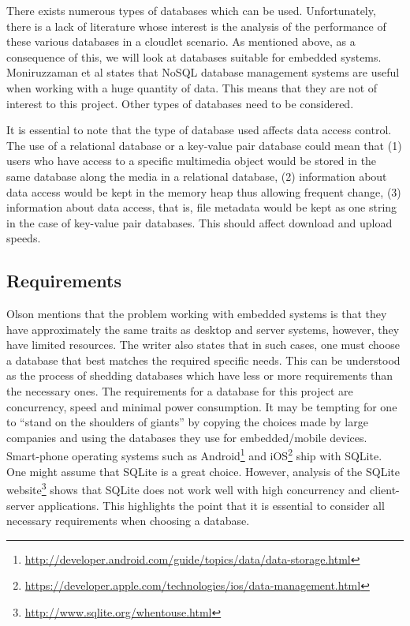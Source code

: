 There exists numerous types of databases which can be used. Unfortunately, there is a lack of literature whose interest is the analysis of the performance of these various databases in a cloudlet scenario.
As mentioned above, as a consequence of this, we will look at databases suitable for embedded systems. Moniruzzaman et al\cite{RefWorks:100} states that NoSQL database management systems are useful when working with
a huge quantity of data. This means that they are not of interest to this project. Other types of databases need to be considered.\newline

It is essential to note that the type of database used affects data access control. The use of a relational database or a key-value pair database could mean that (1) users who have access to a specific
multimedia object would be stored in the same database along the media in a relational database, (2) information about data access would be kept in the memory heap thus allowing frequent change, (3) information about
data access, that is, file metadata would be kept as one string in the case of key-value pair databases. This should affect download and upload speeds.

\subsection{Requirements}

Olson\cite{RefWorks:91} mentions that the problem working with embedded systems is that they have approximately the same traits as desktop and server systems, however, they have limited resources. The writer also
states that in such cases, one must choose a database that best matches the required specific needs. This can be understood as the process of shedding databases which have less or more requirements than the necessary
ones. The requirements for a database for this project are concurrency, speed and minimal power consumption. It may be tempting for one to ``stand on the shoulders of giants'' by copying the choices made by large
companies and using the databases they use for embedded/mobile devices. Smart-phone operating systems such as Android\footnote{\url{ http://developer.android.com/guide/topics/data/data-storage.html}} and
iOS\footnote{\url{https://developer.apple.com/technologies/ios/data-management.html}} ship with SQLite. One might assume that SQLite is a great choice. However, analysis of the SQLite website\footnote{\url{http://www.sqlite.org/whentouse.html}} shows that SQLite does not work well with high concurrency and client-server applications. This highlights the point that it is essential to consider all necessary requirements when choosing a database.

